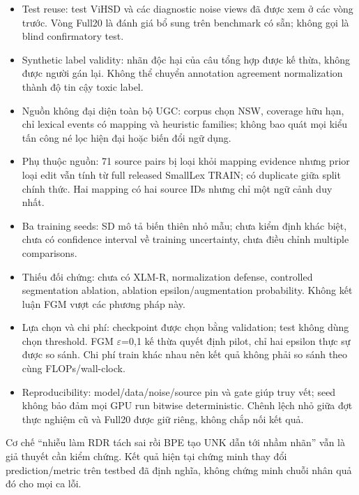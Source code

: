 \documentclass[11pt,a4paper]{article}
\begin{document}
\begin{itemize}

\item Test reuse: test ViHSD và các diagnostic noise views đã được xem ở các vòng trước. Vòng Full20 là đánh giá bổ sung trên benchmark có sẵn; không gọi là blind confirmatory test.

\item Synthetic label validity: nhãn độc hại của câu tổng hợp được kế thừa, không được người gán lại. Không thể chuyển annotation agreement normalization thành độ tin cậy toxic label.

\item Nguồn không đại diện toàn bộ UGC: corpus chọn NSW, coverage hữu hạn, chỉ lexical events có mapping và heuristic families; không bao quát mọi kiểu tấn công né lọc hiện đại hoặc biến đổi ngữ dụng.

\item Phụ thuộc nguồn: 71 source pairs bị loại khỏi mapping evidence nhưng prior loại edit vẫn tính từ full released SmallLex TRAIN; có duplicate giữa split chính thức. Hai mapping có hai source IDs nhưng chỉ một ngữ cảnh duy nhất.

\item Ba training seeds: SD mô tả biến thiên nhỏ mẫu; chưa kiểm định khác biệt, chưa có confidence interval về training uncertainty, chưa điều chỉnh multiple comparisons.

\item Thiếu đối chứng: chưa có XLM-R, normalization defense, controlled segmentation ablation, ablation epsilon/augmentation probability. Không kết luận FGM vượt các phương pháp này.

\item Lựa chọn và chi phí: checkpoint được chọn bằng validation; test không dùng chọn threshold. FGM \ensuremath{\varepsilon}=0,1 kế thừa quyết định pilot, chỉ hai epsilon thực sự được so sánh. Chi phí train khác nhau nên kết quả không phải so sánh theo cùng FLOPs/wall-clock.

\item Reproducibility: model/data/noise/source pin và gate giúp truy vết; seed không bảo đảm mọi GPU run bitwise deterministic. Chênh lệch nhỏ giữa đợt thực nghiệm cũ và Full20 được giữ riêng, không chắp nối kết quả.

\end{itemize}

Cơ chế “nhiễu làm RDR tách sai rồi BPE tạo UNK dẫn tới nhầm nhãn” vẫn là giả thuyết cần kiểm chứng. Kết quả hiện tại chứng minh thay đổi prediction/metric trên testbed đã định nghĩa, không chứng minh chuỗi nhân quả đó cho mọi ca lỗi.
\end{document}
